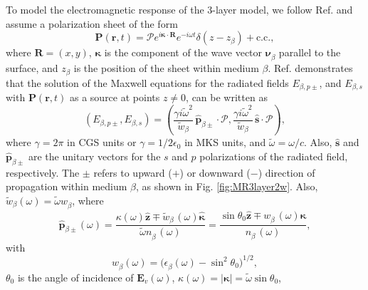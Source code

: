 To model the electromagnetic response of the 3-layer model, we follow Ref.
\cite{mizrahiJOSA88} and assume a polarization sheet of the form
\begin{equation}\label{eq:psheet}
\mathbf{P}(\mathbf{r},t) = \boldsymbol{\mathcal{P}}
e^{i\boldsymbol{\kappa}\cdot\mathbf{R}}e^{-i\omega t}\delta(z - z_{\beta}) 
+ \mathrm{c.c.},
\end{equation}
where $\mathbf{R}=(x,y)$, $\boldsymbol{\kappa}$ is the component of the wave
vector $\boldsymbol{\nu}^{\phantom{a}}_{\beta}$ parallel to the surface, and
$z_{\beta}$ is the position of the sheet within medium $\beta$. Ref.
\cite{sipeJOSAB87} demonstrates that the solution of the Maxwell equations for
the radiated fields $E_{\beta,p\pm}$, and $E_{\beta,s}$ with
$\mathbf{P}(\mathbf{r},t)$ as a source at points $z\neq 0$, can be written as
\begin{equation}\label{eq:solmaxwell}
(E_{\beta,p\pm},E_{\beta,s}) = 
(\frac{\gamma i\tilde{\omega}^2}{\tilde{w}_{\beta}}
\,\hat{\mathbf{p}}_{\beta\pm}\cdot\boldsymbol{\mathcal{P}},
\frac{\gamma i\tilde{\omega}^2}{\tilde{w}_{\beta}}
\,\hat{\mathbf{s}}\cdot\boldsymbol{\mathcal{P}}),
\end{equation} 
where $\gamma=2\pi$ in CGS units or $\gamma=1/2\epsilon_{0}$ in MKS units, and
$\tilde{\omega}=\omega/c$. Also, $\hat{\mathbf{s}}$ and
$\hat{\mathbf{p}}_{\beta\pm}$ are the unitary vectors for the $s$ and $p$
polarizations of the radiated field, respectively. The $\pm$ refers to upward
($+$) or downward ($-$) direction of propagation within medium $\beta$, as shown
in Fig. \ref{fig:MR3layer2w}. Also,
$\tilde{w}^{\phantom{a}}_{\beta}(\omega)=\tilde{\omega}w^{\phantom{a}}_{\beta}$,
where
\begin{equation}\label{eq:r4}
\hat{\mathbf{p}}^{\phantom{A}}_{\beta\pm}(\omega) =
  \frac{\kappa(\omega)\hat{\mathbf{z}}\mp 
  \tilde{w}^{\phantom{A}}_{\beta}(\omega)\hat{\boldsymbol{\kappa}}} 
  {\tilde{\omega} n^{\phantom{A}}_{\beta}(\omega)}
= \frac{\sin\theta_{0}\hat{\mathbf{z}}\mp 
  w^{\phantom{A}}_{\beta}(\omega)\hat{\boldsymbol{\kappa}}} 
  {n^{\phantom{A}}_{\beta}(\omega)},
\end{equation}
with
\begin{equation}\label{eq:wavevector}
w^{\phantom{a}}_{\beta}(\omega) = 
\big(\epsilon^{\phantom{a}}_{\beta}(\omega) - \sin^{2}\theta_{0}\big)^{1/2},
\end{equation}
$\theta_{0}$ is the angle of incidence of $\mathbf{E}_{v}(\omega)$,
$\kappa(\omega)=\vert\boldsymbol{\kappa}\vert = \tilde{\omega}\sin\theta_{0}$,
